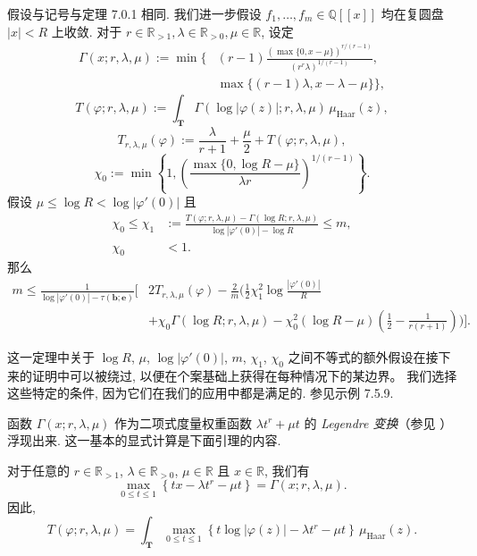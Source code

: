 \begin{theorem}\label{thm:7.1.13}
假设与记号与定理 7.0.1 相同. 我们进一步假设 \(f_1, \ldots, f_m \in \mathbb{Q}[\![x]\!]\) 均在复圆盘 \(|x| < R\) 上收敛. 
对于 \(r \in \mathbb{R}_{>1}, \lambda \in \mathbb{R}_{>0}, \mu \in \mathbb{R}\), 设定
\[
\begin{aligned}
\Gamma(x; r, \lambda, \mu) := \min \Big\{ &(r - 1) \frac{\left( \max\{0, x - \mu\}\right)^{r/(r - 1)}}{(r^r \lambda)^{1/(r - 1)}}, \\
&\max\{(r - 1)\lambda, x - \lambda - \mu\} \Big\},
\end{aligned}
\]
\[ T(\varphi; r, \lambda, \mu) := \int_{\mathbf{T}} \Gamma(\log |\varphi(z)|; r, \lambda, \mu) \, \mu_{\text{Haar}}(z), \]
\[ T_{r,\lambda,\mu}(\varphi) := \frac{\lambda}{r + 1} + \frac{\mu}{2} + T(\varphi; r, \lambda, \mu), \]
\[ \chi_0 := \min \left\{ 1, \left( \frac{\max\{0, \log R - \mu\}}{\lambda r} \right)^{1/(r - 1)} \right\}. \]
假设 \(\mu \leq \log R < \log |\varphi'(0)|\) 且
\[
\begin{aligned}
\chi_0 \le \chi_1 &:= \frac{T(\varphi; r, \lambda, \mu) - \Gamma(\log R; r, \lambda, \mu)}{\log |\varphi'(0)| - \log R} \le m, \\
\chi_0 &< 1.
\end{aligned}
\]
那么
\begin{equation}\label{eq:7.1.14}
\begin{aligned}
m \leq \frac{1}{\log |\varphi'(0)| - \tau(\mathbf{b}; \mathbf{e})} \Bigg[ &2T_{r,\lambda,\mu}(\varphi) - \frac{2}{m} \bigg(\frac{1}{2} \chi_1^2 \log \frac{|\varphi'(0)|}{R} \\
&+ \chi_0 \Gamma(\log R; r, \lambda, \mu) - \chi_0^2 (\log R - \mu) \left(\frac{1}{2} - \frac{1}{r(r+1)}\right)\bigg)\Bigg].
\end{aligned}
\end{equation}
\end{theorem}

这一定理中关于 \(\log R\), \(\mu\), \(\log |\varphi'(0)|\), \(m\), \(\chi_1\), \(\chi_0\) 之间不等式的额外假设在接下来的证明中可以被绕过, 
以便在个案基础上获得在每种情况下的某边界。 我们选择这些特定的条件, 因为它们在我们的应用中都是满足的. 
参见示例 7.5.9.

函数 \(\Gamma(x; r, \lambda, \mu)\) 作为二项式度量权重函数 \(\lambda t^r + \mu t\) 的 \emph{Legendre 变换}（参见 \cite[第 VI 节]{Ell06}）浮现出来. 
这一基本的显式计算是下面引理的内容.

\begin{lemma}\label{lem:7.1.15}
对于任意的 \(r \in \mathbb{R}_{>1}\), \(\lambda \in \mathbb{R}_{>0}\), \(\mu \in \mathbb{R}\) 且 \(x \in \mathbb{R}\), 我们有
\[ \max_{0 \le t \le 1} \left\{ tx - \lambda t^r - \mu t \right\} = \Gamma(x; r, \lambda, \mu). \]
因此,
\[ T(\varphi; r, \lambda, \mu) = \int_{\mathbf{T}} \max_{0 \le t \le 1} \left\{ t \log |\varphi(z)| - \lambda t^r - \mu t \right\} \, \mu_{\text{Haar}}(z). \]
\end{lemma}

